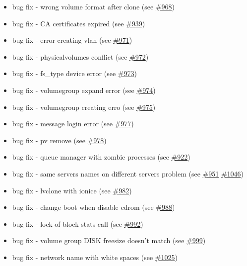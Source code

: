 \begin{itemize}
    \item bug fix - wrong volume format after clone (see \href{https://srcmaster.eurotux.com/pm/p/etva/ticket/968}{\#968})
    \item bug fix - CA certificates expired (see \href{https://srcmaster.eurotux.com/pm/p/etva/ticket/939}{\#939})
    \item bug fix - error creating vlan (see \href{https://srcmaster.eurotux.com/pm/p/etva/ticket/971}{\#971})
    \item bug fix - physicalvolumes conflict (see \href{https://srcmaster.eurotux.com/pm/p/etva/ticket/972}{\#972})
    \item bug fix - fs\_type device error (see \href{https://srcmaster.eurotux.com/pm/p/etva/ticket/973}{\#973})
    \item bug fix - volumegroup expand error (see \href{https://srcmaster.eurotux.com/pm/p/etva/ticket/974}{\#974})
    \item bug fix - volumegroup creating erro (see \href{https://srcmaster.eurotux.com/pm/p/etva/ticket/975}{\#975})
    \item bug fix - message login error (see \href{https://srcmaster.eurotux.com/pm/p/etva/ticket/977}{\#977})
    \item bug fix - pv remove (see \href{https://srcmaster.eurotux.com/pm/p/etva/ticket/978}{\#978})
    \item bug fix - queue manager with zombie processes (see \href{https://srcmaster.eurotux.com/pm/p/etva/ticket/922}{\#922})
    \item bug fix - same servers names on different servers problem (see \href{https://srcmaster.eurotux.com/pm/p/etva/ticket/951}{\#951} \href{https://srcmaster.eurotux.com/pm/p/etva/ticket/1046}{\#1046})
    \item bug fix - lvclone with ionice (see \href{https://srcmaster.eurotux.com/pm/p/etva/ticket/982}{\#982})
    \item bug fix - change boot when disable cdrom (see \href{https://srcmaster.eurotux.com/pm/p/etva/ticket/988}{\#988})
    \item bug fix - lock of block stats call (see \href{https://srcmaster.eurotux.com/pm/p/etva/ticket/992}{\#992})
    \item bug fix - volume group DISK freesize doesn't match (see \href{https://srcmaster.eurotux.com/pm/p/etva/ticket/999}{\#999})
    \item bug fix - network name with white spaces (see \href{https://srcmaster.eurotux.com/pm/p/etva/ticket/1025}{\#1025})

\end{itemize}

